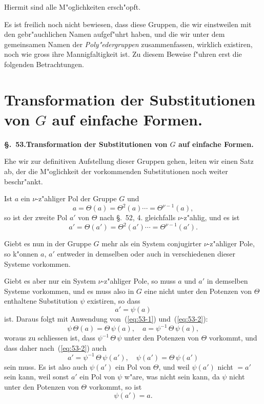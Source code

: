 \documentclass[12pt,a4paper]{article}
\theoremstyle{definition}
\begin{document}
Hiermit sind alle M"oglichkeiten ersch"opft.

Es ist freilich noch nicht bewiesen, dass diese Gruppen, die wir einstweilen mit den gebr"auchlichen Namen aufgef"uhrt haben, und die wir unter dem gemeinsamen Namen der \emph{Poly"edergruppen} zusammenfassen, wirklich existiren, noch wie gross ihre Mannigfaltigkeit ist. Zu diesem Beweise f"uhren erst die folgenden Betrachtungen.


\section{Transformation der Substitutionen von $G$ auf einfache Formen.}\label{sec:53}

\noindent\textbf{\S.~53.}\quad\textbf{Transformation der Substitutionen von $G$ auf einfache Formen.}
\vspace{0.3cm}

Ehe wir zur definitiven Aufstellung dieser Gruppen gehen, leiten wir einen Satz ab, der die M"oglichkeit der vorkommenden Substitutionen noch weiter beschr"ankt.

Ist $a$ ein $\nu$-z"ahliger Pol der Gruppe $G$ und
\begin{equation}\label{eq:53-1}
a = \Theta(a) = \Theta^2(a) \cdots = \Theta^{\nu-1}(a),
\end{equation}
so ist der zweite Pol $a'$ von $\Theta$ nach \S.~52, 4. gleichfalls $\nu$-z"ahlig, und es ist
\begin{equation}\label{eq:53-2}
a' = \Theta(a') = \Theta^2(a') \cdots = \Theta^{\nu-1}(a').
\end{equation}

Giebt es nun in der Gruppe $G$ mehr als ein System conjugirter $\nu$-z"ahliger Pole, so k"onnen $a$, $a'$ entweder in demselben oder auch in verschiedenen dieser Systeme vorkommen.

Giebt es aber nur ein System $\nu$-z"ahliger Pole, so muss $a$ und $a'$ in demselben Systeme vorkommen, und es muss also in $G$ eine nicht unter den Potenzen von $\Theta$ enthaltene Substitution $\psi$ existiren, so dass
\begin{equation}\label{eq:53-3}
a' = \psi(a)
\end{equation}
ist. Daraus folgt mit Anwendung von~(\ref{eq:53-1}) und~(\ref{eq:53-2}):
\[
\psi\,\Theta(a) = \Theta\,\psi(a), \quad a = \psi^{-1}\,\Theta\,\psi(a),
\]
woraus zu schliessen ist, dass $\psi^{-1}\,\Theta\,\psi$ unter den Potenzen von $\Theta$ vorkommt, und dass daher nach~(\ref{eq:53-2}) auch
\[
a' = \psi^{-1}\,\Theta\,\psi(a'), \quad \psi(a') = \Theta\,\psi(a')
\]
sein muss. Es ist also auch $\psi(a')$ ein Pol von $\Theta$, und weil $\psi(a')$ nicht $= a'$ sein kann, weil sonst $a'$ ein Pol von $\psi$ w"are, was nicht sein kann, da $\psi$ nicht unter den Potenzen von $\Theta$ vorkommt, so ist
\begin{equation}\label{eq:53-4}
\psi(a') = a.
\end{equation}
\end{document}
